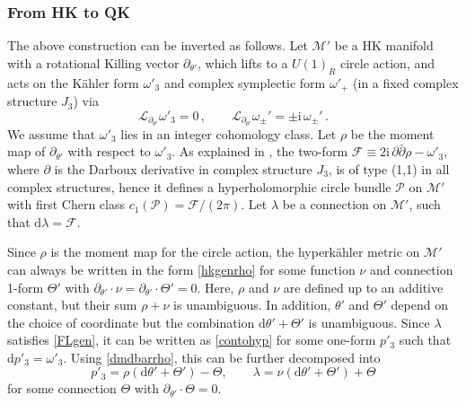 \documentclass[12pt,reqno]{article}
\numberwithin{equation}{section}
\newcommand{\be}{\begin{equation}}
\newcommand{\ee}{\end{equation}}
\def\({\left(}
\def\){\right)}
\newcommand{\de}{\mathrm{d}}
\newcommand{\I}{\mathrm{i}}
\newcommand{\cL}{\mathcal{L}}
\newcommand{\cM}{\mathcal{M}}
\newcommand{\cP}{\mathcal{P}}
\newcommand{\fb}{\mathscr{F}}
\def\pa{\partial}
\newcommand{\kahler}{{K\"ahler}\xspace}
\newcommand{\hk}{{hyperk\"ahler}\xspace}
\def\phip{{\theta'}}
\def\kcon{p'_3}
\def\pTheta{\Theta'}
\def\pcM{\cM'}
\def\pomega{\omega'}
\def\cfff{\nu} %
\def\conhyper{\lambda}
\numberwithin{equation}{section}
\begin{document}
\subsubsection{From HK to QK}

The above construction can be inverted as follows.
Let $\pcM$ be a HK manifold with a rotational Killing vector $\pa_\phip$,
which lifts to a $U(1)_R$ circle action, and
acts on the \kahler form $\pomega_3$ and complex symplectic form $\pomega_+$
(in a fixed complex structure $J_3$) via
\be
\cL_{\pa_\phip}\pomega_3=0\, ,
\qquad
\cL_{\pa_\phip}\omega_\pm'=\pm\I\, \omega_\pm'\, .
\ee
We assume that $\pomega_3$ lies in an integer cohomology class.
Let $\rho$ be the moment map of $\pa_\phip$ with respect to $\pomega_3$.
As explained in \cite{Hitchin-Newton2011}, the two-form $\fb\equiv
2\I \, \pa\bar\pa \rho - \pomega_3$, where $\pa$ is the Darboux derivative
in complex structure $J_3$, is  of type (1,1) in all complex structures, hence
it defines a hyperholomorphic circle bundle $\cP$ on $\pcM$ with first
Chern class $c_1(\cP)=\fb/(2\pi)$. Let $\conhyper$ be a connection on $\pcM$,
such that $\de\lambda=\fb$.

Since $\rho$ is the moment map for the circle action, the \hk metric on $\pcM$ can always be written in  the form \eqref{hkgenrho}
for some function $\cfff$ and connection 1-form $\pTheta$ with
$\pa_\phip\cdot \cfff=\pa_\phip\cdot \pTheta=0$. Here, $\rho$ and $\cfff$
are defined up to an additive constant, but their sum $\rho+\cfff$ is unambiguous.
In addition, $\phip$ and $\pTheta$ depend on the choice of coordinate but
the combination $\de\phip+\pTheta$ is unambiguous.
Since $\lambda$ satisfies \eqref{FLgen}, it  can be written
as \eqref{contohyp} for some one-form $\kcon$ such that $\de \kcon=\pomega_3$.
Using \eqref{dmdbarrho}, this can be further decomposed into
\be
\label{defkcon}
\kcon = \rho \left( \de \phip+\pTheta \right) -\Theta ,
\qquad
\conhyper =\cfff \( \de\phip+\pTheta\) + \Theta
\ee
for some connection $\Theta$ with $\pa_\phip\cdot \Theta=0$.
\end{document}

